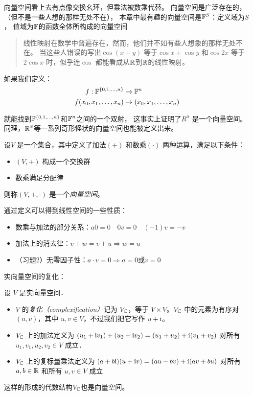 向量空间看上去有点像交换幺环，但乘法被数乘代替。
向量空间是广泛存在的，（但不是一些人想的那样无处不在），
本章中最有趣的向量空间是\(\mathbb{F}^{S}\)：定义域为\(S\)，
值域为\(\mathbb{F}\)的函数全体所构成的向量空间
\begin{quote}
    线性映射在数学中普遍存在，然而，他们并不如有些人想象的那样无处不在。
    当这些人错误的写出\(\cos(x+y)\) 等于\(\cos x+\cos y\) 和\(\cos 2x\)
    等于 \(2\cos x\) 时，似乎连\(\cos\)
    都能看成从\(\mathbb{R}\)到\(\mathbb{R}\)的线性映射。
\end{quote}
如果我们定义：
\[
    \begin{aligned}
        f: \mathbb{F}^{\{0,1,\dots,n\}} &\to \mathbb{F}^{n}\\
        f(x_{0}, x_{1}, \dots, x_{n}) &\mapsto (x_{0},
        x_{1}, \dots, x_{n})
    \end{aligned}
\]

就能找到\(\mathbb{F}^{\{0,1,\dots,n\}}\)和\(\mathbb{F}^{n}\)之间的一个双射，
这事实上证明了\(R^{n}\)
是一个向量空间。
同理，\(\mathbb{R}^{\mathbb{R}}\)等一系列奇形怪状的向量空间也能被定义出来。
\begin{definition}
    设\(V\) 是一个集合，其中定义了加法\((+)\) 和数乘\((\cdot)\) 两种运算，满足以下条件：
    \begin{itemize}
        \item \((V, +)\) 构成一个交换群
        \item 数乘满足分配律
    \end{itemize}
    则称\((V, +, \cdot)\) 是一个\emph{向量空间}。
\end{definition}

通过定义可以得到线性空间的一些性质：
\begin{itemize}
    \item 数乘与加法的部分关系：\(a0=0\quad 0v=0\quad (-1)v=-v\)
    \item 加法上的消去律：\(v+w=v+u \Rightarrow w=u \)
    \item （习题2）无零因子性：\(a\cdot v=0 \Rightarrow a=0
        \text{或} v=0\)
\end{itemize}

实向量空间的复化：
\begin{definition}
    设 \(V\) 是实向量空间．
    \begin{itemize}
        \item \(V\) 的\emph{复化（complexification）}记为
            \(V_{\mathbb{C}}\)，等于 \(V \times
            V\)。\(V_{\mathbb{C}}\)
            中的元素为有序对 \((u, v)\)，其中
            \(u, v \in V\)，不过我们把它写作 \(u + \mathrm{i} \)。
        \item \(V_{\mathbb{C}}\) 上的加法定义为
            \((u_1 + \mathrm{i} v_1) + (u_2 + \mathrm{i} v_2) = (u_1 +
            u_2) + \mathrm{i} (v_1 + v_2)\)
            对所有 \(u_1, v_1, u_2, v_2 \in V\) 成立．
        \item \(V_{\mathbb{C}}\) 上的复标量乘法定义为
            \((a + b\mathrm{i}) (u + \mathrm{i} v) =
                (au - bv) +
            \mathrm{i} (av + bu)\)
            对所有 \(a, b \in \mathbb{R}\) 和所有 \(u, v \in V\) 成立
    \end{itemize}
\end{definition}
这样的形成的代数结构\(V_{\mathbb{C}}\)也是向量空间。

